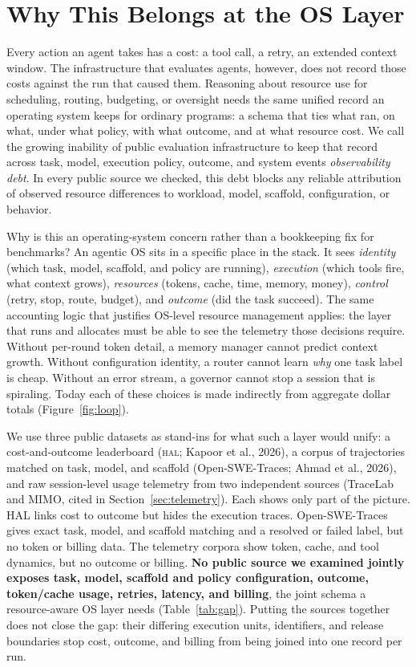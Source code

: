 \documentclass{article}
\newcommand{\hal}{\textsc{hal}}
\begin{document}
\section{Why This Belongs at the OS Layer}
\label{sec:os-layer}

Every action an agent takes has a cost: a tool call, a retry, an extended context window. The infrastructure that evaluates agents, however, does not record those costs against the run that caused them. Reasoning about resource use for scheduling, routing, budgeting, or oversight needs the same unified record an operating system keeps for ordinary programs: a schema that ties what ran, on what, under what policy, with what outcome, and at what resource cost. We call the growing inability of public evaluation infrastructure to keep that record across task, model, execution policy, outcome, and system events \emph{observability debt}. In every public source we checked, this debt blocks any reliable attribution of observed resource differences to workload, model, scaffold, configuration, or behavior.

Why is this an operating-system concern rather than a bookkeeping fix for benchmarks? An agentic OS sits in a specific place in the stack. It sees \emph{identity} (which task, model, scaffold, and policy are running), \emph{execution} (which tools fire, what context grows), \emph{resources} (tokens, cache, time, memory, money), \emph{control} (retry, stop, route, budget), and \emph{outcome} (did the task succeed). The same accounting logic that justifies OS-level resource management applies: the layer that runs and allocates must be able to see the telemetry those decisions require. Without per-round token detail, a memory manager cannot predict context growth. Without configuration identity, a router cannot learn \emph{why} one task label is cheap. Without an error stream, a governor cannot stop a session that is spiraling. Today each of these choices is made indirectly from aggregate dollar totals (Figure~\ref{fig:loop}).

We use three public datasets as stand-ins for what such a layer would unify: a cost-and-outcome leaderboard (\hal{}; Kapoor et al., 2026), a corpus of trajectories matched on task, model, and scaffold (Open-SWE-Traces; Ahmad et al., 2026), and raw session-level usage telemetry from two independent sources (TraceLab and MIMO, cited in Section~\ref{sec:telemetry}). Each shows only part of the picture. HAL links cost to outcome but hides the execution traces. Open-SWE-Traces gives exact task, model, and scaffold matching and a resolved or failed label, but no token or billing data. The telemetry corpora show token, cache, and tool dynamics, but no outcome or billing. \textbf{No public source we examined jointly exposes task, model, scaffold and policy configuration, outcome, token/cache usage, retries, latency, and billing}, the joint schema a resource-aware OS layer needs (Table~\ref{tab:gap}). Putting the sources together does not close the gap: their differing execution units, identifiers, and release boundaries stop cost, outcome, and billing from being joined into one record per run.
\end{document}
